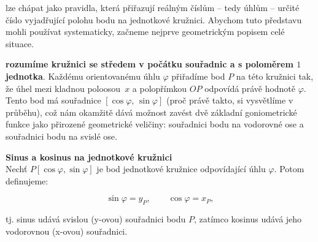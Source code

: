 \documentclass[12pt,a4paper]{article}
\begin{document}
 lze chápat jako pravidla, která přiřazují reálným číslům – tedy úhlům – určité 
číslo vyjadřující polohu bodu na jednotkové kružnici. Abychom tuto představu mohli používat 
systematicky, začneme nejprve geometrickým popisem celé situace.

 \textbf{rozumíme kružnici se středem v počátku souřadnic a s poloměrem $1$ jednotka}. 
Každému orientovanému úhlu $\varphi$ přiřadíme bod $P$ na této kružnici tak, že úhel mezi 
kladnou poloosou~$x$ a polopřímkou $OP$ odpovídá právě hodnotě $\varphi$. Tento bod má souřadnice 
$[\cos\varphi,\,\sin\varphi]$ (proč právě takto, si vysvětlíme v průběhu), což nám okamžitě dává možnost zavést dvě základní goniometrické funkce 
jako přirozené geometrické veličiny: souřadnici bodu na vodorovné ose a souřadnici bodu na svislé ose. 

\begin{definitionbox}
\textbf{Sinus a kosinus na jednotkové kružnici}\\
Nechť $P[\cos\varphi,\sin\varphi]$ je bod jednotkové kružnice odpovídající úhlu $\varphi$. 
Potom definujeme:

\[
\sin\varphi = y_{P}, \qquad
\cos\varphi = x_{P},
\]

tj. sinus udává svislou (y-ovou) souřadnici bodu $P$, zatímco kosinus udává jeho vodorovnou 
(x-ovou) souřadnici.
\end{definitionbox}

\begin{center}
\end{center}
\end{document}
